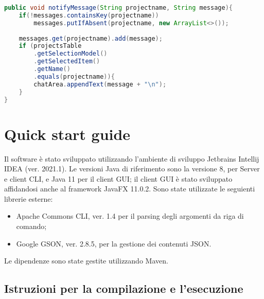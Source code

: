 \documentclass{article}
\begin{document}
\begin{lstlisting}[language=Java, caption=Il metodo \texttt{notifyMessage()}]
public void notifyMessage(String projectname, String message){
    if(!messages.containsKey(projectname)) 
        messages.putIfAbsent(projectname, new ArrayList<>());
        
    messages.get(projectname).add(message);
    if (projectsTable
        .getSelectionModel()
        .getSelectedItem()
        .getName()
        .equals(projectname)){
        chatArea.appendText(message + "\n");
    }
}
\end{lstlisting}

\newpage
\section{Quick start guide}
Il software è stato sviluppato utilizzando l'ambiente di sviluppo Jetbrains Intellij IDEA (ver. 2021.1). Le versioni Java di riferimento sono la versione 8, per Server e client CLI, e Java 11 per il client GUI; il client GUI è stato sviluppato affidandosi anche al framework JavaFX 11.0.2. 
Sono state utilizzate le seguienti librerie esterne:
\begin{itemize}
    \item Apache Commons CLI, ver. 1.4 per il parsing degli argomenti da riga di comando;
    \item Google GSON, ver. 2.8.5, per la gestione dei contenuti JSON.
\end{itemize}
Le dipendenze sono state gestite utilizzando Maven.

\subsection{Istruzioni per la compilazione e l'esecuzione}
\end{document}

